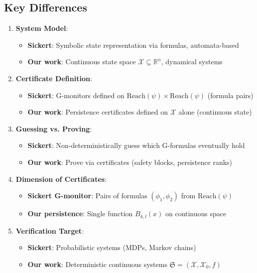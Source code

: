 \documentclass{article}
\begin{document}
\subsection{Key Differences}

\begin{enumerate}
    \item \textbf{System Model}:
    \begin{itemize}
        \item \textbf{Sickert}: Symbolic state representation via formulas, automata-based
        \item \textbf{Our work}: Continuous state space $\mathcal{X} \subseteq \mathbb{R}^n$, dynamical systems
    \end{itemize}

    \item \textbf{Certificate Definition}:
    \begin{itemize}
        \item \textbf{Sickert}: G-monitors defined on $\text{Reach}(\psi) \times \text{Reach}(\psi)$ (formula pairs)
        \item \textbf{Our work}: Persistence certificates defined on $\mathcal{X}$ alone (continuous state)
    \end{itemize}

    \item \textbf{Guessing vs. Proving}:
    \begin{itemize}
        \item \textbf{Sickert}: Non-deterministically guess which G-formulas eventually hold
        \item \textbf{Our work}: Prove via certificates (safety blocks, persistence ranks)
    \end{itemize}

    \item \textbf{Dimension of Certificates}:
    \begin{itemize}
        \item \textbf{Sickert G-monitor}: Pairs of formulas $(\phi_1, \phi_2)$ from $\text{Reach}(\psi)$
        \item \textbf{Our persistence}: Single function $B_{k,l}(x)$ on continuous space
    \end{itemize}

    \item \textbf{Verification Target}:
    \begin{itemize}
        \item \textbf{Sickert}: Probabilistic systems (MDPs, Markov chains)
        \item \textbf{Our work}: Deterministic continuous systems $\mathfrak{S} = (\mathcal{X}, \mathcal{X}_0, f)$
    \end{itemize}
\end{enumerate}
\end{document}
